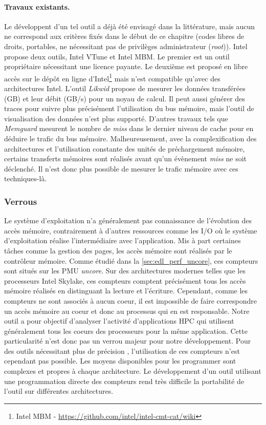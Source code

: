         
        \paragraph{Travaux existants.} Le développent d'un tel outil a déjà été envisagé dans la littérature, mais aucun ne correspond aux critères fixés dans le début de ce chapitre (codes libres de droits, portables, ne nécessitant pas de privilèges administrateur (\textit{root})). 
        Intel propose deux outils, Intel VTune et Intel MBM. Le premier est un outil propriétaire nécessitant une licence payante. Le deuxième est proposé en libre accès sur le dépôt en ligne d'Intel\footnote{Intel MBM - \url{https://github.com/intel/intel-cmt-cat/wiki}} mais n'est compatible qu'avec des architectures Intel. 
        L'outil \textit{Likwid} propose de mesurer les données transférées (GB) et leur débit (GB/s) pour un noyau de calcul. Il peut aussi générer des traces pour suivre plus précisément l'utilisation du bus mémoire, mais l'outil de visualisation des données n'est plus supporté.
        D'autres travaux tels que \textit{Memguard}\cite{Yun2013} mesurent le nombre de \textit{miss} dans le dernier niveau de cache pour en déduire le trafic du bus mémoire. Malheureusement, avec la complexification des architectures et l'utilisation constante des unités de préchargement mémoire, certains transferts mémoires sont réalisés avant qu'un évènement \textit{miss} ne soit déclenché. Il n'est donc plus possible de mesurer le trafic mémoire avec ces techniques-là. 

    \subsubsection{Verrous}
        
        
        Le système d'exploitation n'a généralement pas connaissance de l'évolution des accès mémoire, contrairement à d'autres ressources comme les I/O où le système d'exploitation réalise l'intermédiaire avec l'application. Mis à part certaines tâches comme la gestion des pages, les accès mémoire sont réalisés par le contrôleur mémoire. Comme étudié dans la \autoref{sec:edl_perf_uncore}, ces compteurs sont situés sur les PMU \textit{uncore}. Sur des architectures modernes telles que les processeurs Intel Skylake, ces compteurs comptent précisément tous les accès mémoire réalisés en distinguant la lecture et  l'écriture. Cependant, comme les compteurs ne sont associés à aucun coeur, il est impossible de faire correspondre un accès mémoire au coeur et donc au processus qui en est responsable. Notre outil a pour objectif d'analyser l'activité d'applications HPC qui utilisent généralement tous les coeurs des processeurs pour la même application. Cette particularité n'est donc pas un verrou majeur pour notre développement. Pour des outils nécessitant plus de précision \cite{Larysch2016}, l'utilisation de ces compteurs n'est cependant pas possible. Les moyens disponibles pour les programmer sont complexes et propres à chaque architecture. Le développement d'un outil utilisant une programmation directe des compteurs rend très difficile la portabilité de l'outil sur différentes architectures.
        

